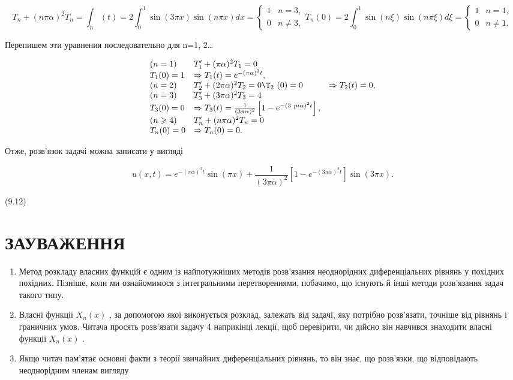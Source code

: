 \documentclass[
  ukrainian,
]{article}
\begin{document}
\[
T_n + (n\pi\alpha)^2 T_n = \int_n (t) = 2 \int_0^1 \sin(3\pi x) \sin(n\pi x) dx =
\begin{cases} 1 &n = 3, \\ 0 & n \neq 3, \end{cases}
T_n(0) = 2 \int_0^1 \sin(n\xi) \sin(n\pi\xi) d\xi =
\begin{cases} 1 &n = 1, \\ 0 & n \neq 1. \end{cases}
\]

Перепишем эти уравнения последовательно для n=1, 2\ldots{}

\[
\begin{array}{lll} (n=1) & T_1' + (\pi\alpha)^2 T_1 = 0 \\ T_1(0) = 1 & \Rightarrow T_1(t) = e^{-(\pi\alpha)^2 t}, \\ (n=2) & T_2' + (2\pi\alpha)^2 T_2 = 0 \T_2\  (0) = 0 & \Rightarrow T_2(t) = 0, \\ (n=3) & T_3' + (3\pi\alpha)^2 T_3 = 4 \\ T_3(0) = 0 & \Rightarrow T_3(t) = \frac{1}{(3\pi\alpha)^2} \left[1 - e^{-(3\ pi\alpha)^2 t}\right], \\ (n \geqslant 4) & T_n' + (n\pi\alpha)^2 T_n = 0 \\ T_n(0) = 0 & \Rightarrow T_n(0) = 0. \end{array}
\]

Отже, розв'язок задачі можна записати у вигляді

\[
u(x, t) = e^{-(\pi\alpha)^2 t} \sin(\pi x) + \frac{1}{(3\pi\alpha)^2} [1 - e^{-(3\pi\alpha)^2 t}] \sin(3\pi x).
\]

(9.12)

\section{ЗАУВАЖЕННЯ}\label{ux437ux430ux443ux432ux430ux436ux435ux43dux43dux44f-6}

\begin{enumerate}
\def\labelenumi{\arabic{enumi}.}
\item
  Метод розкладу власних функцій є одним із найпотужніших методів
  розв'язання неоднорідних диференціальних рівнянь у похідних похідних.
  Пізніше, коли ми ознайомимося з інтегральними перетвореннями,
  побачимо, що існують й інші методи розв'язання задач такого типу.
\item
  Власні функції \(X_n(x)\) , за допомогою якої виконується розклад,
  залежать від задачі, яку потрібно розв'язати, точніше від рівнянь і
  граничних умов. Читача просять розв'язати задачу 4 наприкінці лекції,
  щоб перевірити, чи дійсно він навчився знаходити власні функції
  \(X_n(x)\) .
\item
  Якщо читач пам'ятає основні факти з теорії звичайних диференціальних
  рівнянь, то він знає, що розв'язки, що відповідають неоднорідним
  членам вигляду
\end{enumerate}
\end{document}
